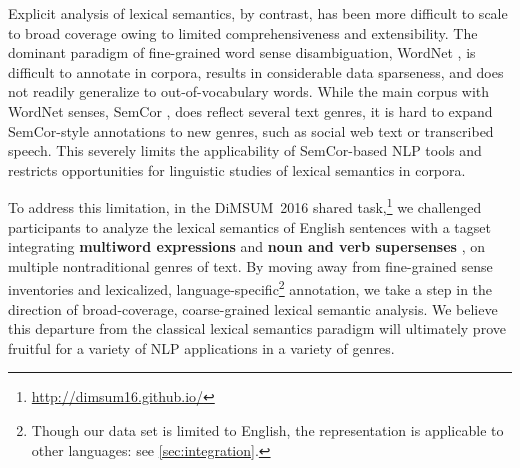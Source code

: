 \documentclass[11pt,letterpaper]{article}
\newcommand{\ensuretext}[1]{#1}
\newcommand{\nssmarker}{\ensuretext{\textcolor{magenta}{\ensuremath{^{\textsc{NS}}_{\textsc{S}}}}}}
\newcommand{\arkcomment}[3]{\ensuretext{\textcolor{#3}{[#1 #2]}}}
\newcommand{\nss}[1]{\arkcomment{\nssmarker}{#1}{magenta}}
\newcommand{\finalversion}[1]{}
\begin{document}
Explicit analysis of lexical semantics, by contrast, has been more difficult to scale 
to broad coverage owing to limited comprehensiveness and extensibility.
The dominant paradigm of fine-grained word sense disambiguation, WordNet \citep{wordnet}, 
is difficult to annotate in corpora, results in considerable data sparseness, 
and does not readily generalize to out-of-vocabulary words.
While the main corpus with WordNet senses, 
SemCor \citep{semcor}, does reflect several text genres, it is hard
to expand SemCor-style annotations to new genres, such as social web text 
or transcribed speech.
This severely limits the applicability of SemCor-based NLP tools 
and restricts opportunities for linguistic studies of lexical semantics in corpora.

\finalversion{\nss{do we want to say something about insights from MT? this needs work:}
Consequently,  \citet{carpuat-05,resnik-06} found that traditional, fine-grained word sense disambiguation 
did indeed \emph{not} improve machine translation. 
\nss{TODO}However, abstracting the senses and moving to multi-word does \citep{chan-07,carpuat-07,lefever-10}.
}


To address this limitation, in the DiMSUM~2016 shared task,\footnote{\url{http://dimsum16.github.io/}} we challenged participants to analyze the lexical semantics of English sentences with a tagset integrating
\textbf{multiword expressions} and \textbf{noun and verb supersenses} \citep[following][]{schneider-15}, 
on multiple nontraditional genres of text. 
By moving away from fine-grained sense inventories and lexicalized, language-specific\footnote{Though our data set is limited to English, the representation is applicable to other languages: see \cref{sec:integration}.} annotation,
we take a step in the direction of broad-coverage, coarse-grained lexical semantic analysis. 
We believe this departure from the classical lexical semantics paradigm 
will ultimately prove fruitful for a variety of NLP applications in a variety of genres. 

\end{document}
